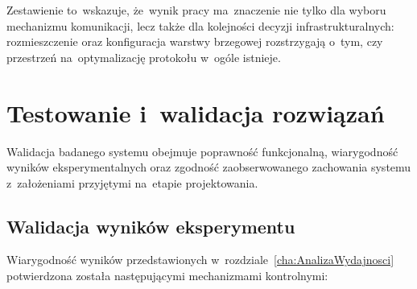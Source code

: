Zestawienie to~wskazuje, że~wynik pracy ma~znaczenie nie tylko dla wyboru mechanizmu komunikacji, lecz także dla kolejności decyzji infrastrukturalnych: rozmieszczenie oraz konfiguracja warstwy brzegowej rozstrzygają o~tym, czy przestrzeń na~optymalizację protokołu w~ogóle istnieje.

\section{Testowanie i~walidacja rozwiązań}
\label{sec:TestowanieWalidacja}

Walidacja badanego systemu obejmuje poprawność funkcjonalną, wiarygodność wyników eksperymentalnych oraz zgodność zaobserwowanego zachowania systemu z~założeniami przyjętymi na~etapie projektowania.

\subsection{Walidacja wyników eksperymentu}
\label{subsec:WalidacjaWynikow}

Wiarygodność wyników przedstawionych w~rozdziale~\ref{cha:AnalizaWydajnosci} potwierdzona została następującymi mechanizmami kontrolnymi:

